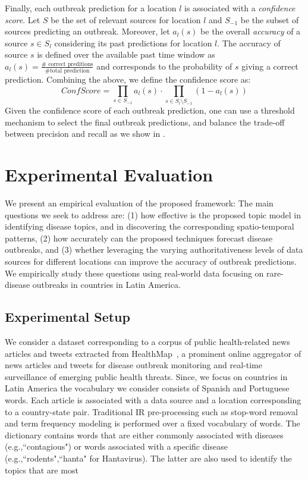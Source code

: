 \documentclass[conference]{IEEEtran}
\begin{document}
Finally, each outbreak prediction for a location $l$ is associated with a {\em confidence score}. Let $S$ be the set of relevant sources for location $l$ and $S_{-1}$ be the subset of sources predicting an outbreak. Moreover, let $a_l(s)$ be the overall {\em accuracy} of a source $s \in S_l$ considering its past predictions for location $l$. The accuracy of source $s$ is defined over the available past time window as $a_l(s) = \frac{\#\mbox{ correct preditions}}{\#\mbox{total prediction}}$ and corresponds to the probability of $s$ giving a correct prediction. Combining the above, we define the confidence score as: 
\begin{equation}
ConfScore = \prod_{s \in S_{-1}}a_l(s) \cdot \prod_{s \in S_l \setminus S_{-1}} (1 - a_l(s))
\end{equation}
Given the confidence score of each outbreak prediction, one can use a threshold mechanism to select the final outbreak predictions, and balance the trade-off between precision and recall as we show in . 

\section{Experimental Evaluation}
\label{sec:exp}
We present an empirical evaluation of the proposed framework: The main questions we seek to address are: (1) how effective is the proposed topic model in identifying disease topics, and in discovering the corresponding spatio-temporal patterns, (2) how accurately can the proposed techniques forecast disease outbreaks, and (3) whether leveraging the varying authoritativeness levels of data sources for different locations can improve the accuracy of outbreak predictions. We empirically study these questions using real-world data focusing on rare-disease outbreaks in countries in Latin America.

\subsection{Experimental Setup}
 We consider a dataset corresponding to a corpus of public health-related news articles and tweets extracted from HealthMap~\cite{healthmap}, a prominent online aggregator of news articles and tweets for disease outbreak monitoring and real-time surveillance of emerging public health threats. Since, we focus on countries in Latin America the vocabulary we consider consists of Spanish and Portuguese words. Each article is associated with a data source and a location corresponding to a country-state pair. Traditional IR pre-processing such as stop-word removal and term frequency modeling is performed over a fixed vocabulary of words. The dictionary contains words that are either commonly associated with diseases (e.g.,``contagious") or words associated with a specific disease (e.g.,``rodents",``hanta" for Hantavirus). The latter are also used to identify the topics that are most 
\end{document}
